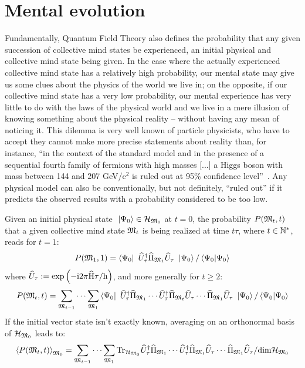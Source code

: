 \documentclass[10pt,a4paper,twoside,openany]{book}
\begin{document}
\section{Mental evolution}

Fundamentally, Quantum Field Theory also defines the probability that any given succession of collective mind states be experienced, an initial physical and collective mind state being given. In the case where the actually experienced collective mind state has a relatively high probability, our mental state may give us some clues about the physics of the world we live in; on the opposite, if our collective mind state has a very low probability, our mental experience has very little to do with the laws of the physical world and we live in a mere illusion of knowing something about the physical reality -- without having any mean of noticing it. This dilemma is very well known of particle physicists, who have to accept they cannot make more precise statements about reality than, for instance, ``in the context of the standard model and in the presence of a sequential fourth family of fermions with high masses [...] a Higgs boson with mass between 144 and 207 GeV/$\mathrm{c}^2$ is ruled out at 95\% confidence level''~\cite{CMS2011}. Any physical model can also be conventionally, but not definitely, ``ruled out'' if it predicts the observed results with a probability considered to be too low.

Given an initial physical state $\ \left|{\Psi_0}\right\rangle \in \mathcal H_{\mathfrak{M}_0}$ at $t = 0$, the probability $P(\mathfrak{M}_t,t)$ that a given collective mind state $\mathfrak{M}_t$ is being realized at time $t \tau$, where $t \in \mathbb{N}^*$, reads for $t = 1$:
\begin{equation*}
P(\mathfrak{M}_1,1) = \left\langle{\Psi_0}\right|\  \widehat{U}^{\dagger}_\tau \widehat{\Pi}_{\mathfrak{M}_1} \widehat{U}_\tau \ \left|{\Psi_0}\right\rangle / \left\langle{\Psi_0}|{\Psi_0}\right\rangle
\end{equation*}
where $\widehat{U}_\tau := \mathrm{exp} \left( {- \mathrm{i} 2 \pi \widehat{\mathrm H} \tau / \mathrm h} \right)$, and more generally for $t \geq 2$:
\begin{equation*}
P(\mathfrak{M}_t,t) = \sum_{\mathfrak{M}_{t - 1}} \dotsm \sum_{\mathfrak{M}_1} \left\langle{\Psi_0}\right|\  \widehat{U}^{\dagger}_\tau \widehat{\Pi}_{\mathfrak{M}_1} \dotsm \widehat{U}^{\dagger}_\tau \widehat{\Pi}_{\mathfrak{M}_t} \widehat{U}_\tau \dotsm \widehat{\Pi}_{\mathfrak{M}_1} \widehat{U}_\tau \ \left|{\Psi_0}\right\rangle / \left\langle{\Psi_0}|{\Psi_0}\right\rangle
\end{equation*}
If the initial vector state isn't exactly known, averaging on an orthonormal basis of $\mathcal H_{\mathfrak{M}_0}$ leads to:
\begin{equation*}
\left< P(\mathfrak{M}_t,t) \right>_{\mathfrak{M}_0} = \sum_{\mathfrak{M}_{t - 1}} \dotsm \sum_{\mathfrak{M}_1} \mathrm{Tr}_{\mathcal H_{\mathfrak{M}_0}} \widehat{U}^{\dagger}_\tau \widehat{\Pi}_{\mathfrak{M}_1} \dotsm \widehat{U}^{\dagger}_\tau \widehat{\Pi}_{\mathfrak{M}_t} \widehat{U}_\tau \dotsm \widehat{\Pi}_{\mathfrak{M}_1} \widehat{U}_\tau / \mathrm{dim} \mathcal H_{\mathfrak{M}_0}
\end{equation*}
\end{document}
